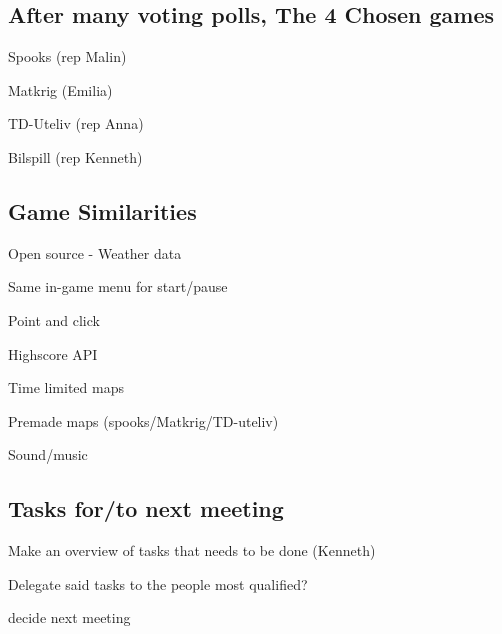 \documentclass[11pt]{meetingmins}
\begin{document}
\subsection{After many voting polls, The 4 Chosen games}
\begin{items}
\item
Spooks (rep Malin)
\item
Matkrig (Emilia)
\item
TD-Uteliv (rep Anna)
\item
Bilspill (rep Kenneth)
\end{items}

\subsection{Game Similarities}
\begin{items}
\item
Open source - Weather data
\item
Same in-game menu for start/pause
\item
Point and click
\item
Highscore API
\item
Time limited maps
\item
Premade maps (spooks/Matkrig/TD-uteliv)
\item
Sound/music
\end{items}

\subsection{Tasks for/to next meeting}
\begin{items}
\item
Make an overview of tasks that needs to be done (Kenneth)
\item
Delegate said tasks to the people most qualified?
\item
decide next meeting 
\end{items}

\vspace{1em}
\end{document}
